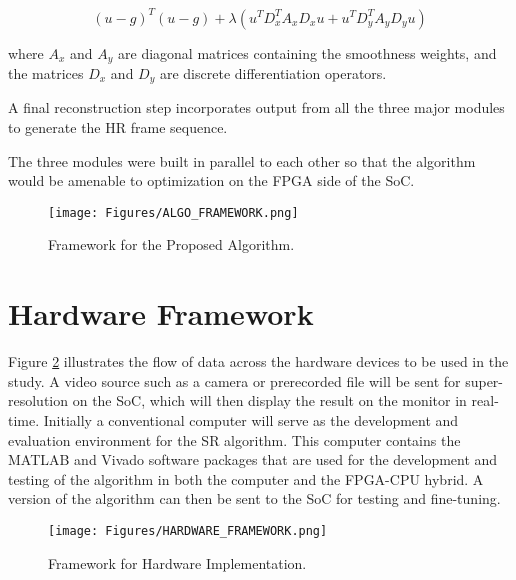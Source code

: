 \begin{equation}
	(u-g)^T(u-g)+\lambda(u^T D_x^T A_x D_x u + u^T D_y^T A_y D_y u)
\end{equation}

where $A_x$ and $A_y$ are diagonal matrices containing the smoothness weights, and the matrices $D_x$ and $D_y$ are discrete differentiation operators.

A final reconstruction step incorporates output from all the three major modules to generate the HR frame sequence.

The three modules were built in parallel to each other so that the algorithm would be amenable to optimization on the FPGA side of the SoC.

\begin{figure}[!ht]
	\centering
	\texttt{[image: Figures/ALGO\_FRAMEWORK.png]}
	\caption[]{Framework for the Proposed Algorithm.}
	\label{fig:algoframe}
\end{figure}




\section{Hardware Framework}
Figure \ref{fig:hardframe} illustrates the flow of data across the hardware devices to be used in the study.
A video source such as a camera or prerecorded file will be sent for super-resolution on the SoC, which will then display the result on the monitor in real-time.
Initially a conventional computer will serve as the development and evaluation  environment for the SR algorithm.
This computer contains the MATLAB and Vivado software packages that are used for the development and testing of the algorithm in both the computer and the FPGA-CPU hybrid.
A version of the algorithm can then be sent to the SoC for testing and fine-tuning.

\begin{figure}[!ht]
	\centering
	\texttt{[image: Figures/HARDWARE\_FRAMEWORK.png]}
	\caption[]{Framework for Hardware Implementation.}
	\label{fig:hardframe}
\end{figure}





